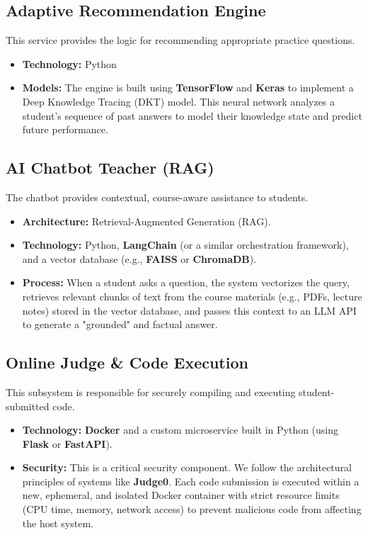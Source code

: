 \subsection{Adaptive Recommendation Engine}
This service provides the logic for recommending appropriate practice questions.
\begin{itemize}
    \item \textbf{Technology:} Python
    \item \textbf{Models:} The engine is built using \textbf{TensorFlow} and \textbf{Keras} to implement a Deep Knowledge Tracing (DKT) model. This neural network analyzes a student's sequence of past answers to model their knowledge state and predict future performance.
\end{itemize}

\subsection{AI Chatbot Teacher (RAG)}
The chatbot provides contextual, course-aware assistance to students.
\begin{itemize}
    \item \textbf{Architecture:} Retrieval-Augmented Generation (RAG).
    \item \textbf{Technology:} Python, \textbf{LangChain} (or a similar orchestration framework), and a vector database (e.g., \textbf{FAISS} or \textbf{ChromaDB}).
    \item \textbf{Process:} When a student asks a question, the system vectorizes the query, retrieves relevant chunks of text from the course materials (e.g., PDFs, lecture notes) stored in the vector database, and passes this context to an LLM API to generate a "grounded" and factual answer.
\end{itemize}

\subsection{Online Judge \& Code Execution}
This subsystem is responsible for securely compiling and executing student-submitted code.
\begin{itemize}
    \item \textbf{Technology:} \textbf{Docker} and a custom microservice built in Python (using \textbf{Flask} or \textbf{FastAPI}).
    \item \textbf{Security:} This is a critical security component. We follow the architectural principles of systems like \textbf{Judge0}. Each code submission is executed within a new, ephemeral, and isolated Docker container with strict resource limits (CPU time, memory, network access) to prevent malicious code from affecting the host system.
\end{itemize}

